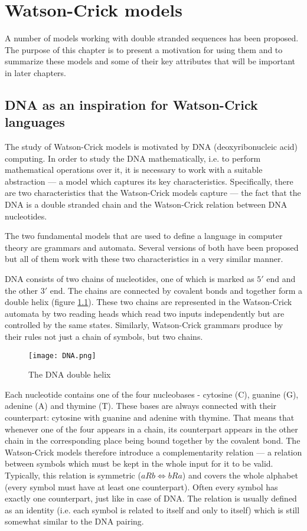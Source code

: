 \chapter{Watson-Crick models} \label{chapter:models}
A number of models working with double stranded sequences has been proposed. The purpose of this chapter is to present a motivation for using them and to summarize these models and some of their key attributes that will be important in later chapters.

\section{DNA as an inspiration for Watson-Crick languages}
The study of Watson-Crick models is motivated by DNA (deoxyribonucleic acid) computing. In order to study the DNA mathematically, i.e. to perform mathematical operations over it, it is necessary to work with a suitable abstraction --- a model which captures its key characteristics. Specifically, there are two characteristics that the Watson-Crick models capture --- the fact that the DNA is a double stranded chain and the Watson-Crick relation between DNA nucleotides.

The two fundamental models that are used to define a language in computer theory are grammars and automata. Several versions of both have been proposed but all of them work with these two characteristics in a very similar manner.

DNA consists of two chains of nucleotides, one of which is marked as $5'$ end and the other $3'$ end. The chains are connected by covalent bonds and together form a double helix (figure \ref{fig:dna}). These two chains are represented in the Watson-Crick automata by two reading heads which read two inputs independently but are controlled by the same states. Similarly, Watson-Crick grammars produce by their rules not just a chain of symbols, but two chains.

\begin{figure}[ht]
  \texttt{[image: DNA.png]}
  \centering
  \label{fig:dna}
  \caption{The DNA double helix}
\end{figure}

Each nucleotide contains one of the four nucleobases - cytosine (C), guanine (G), adenine (A) and thymine (T). These bases are always connected with their counterpart: cytosine with guanine and adenine with thymine. That means that whenever one of the four appears in a chain, its counterpart appears in the other chain in the corresponding place being bound together by the covalent bond. The Watson-Crick models therefore introduce a complementarity relation --- a relation between symbols which must be kept in the whole input for it to be valid. Typically, this relation is symmetric ($a R b \Leftrightarrow b R a$) and covers the whole alphabet (every symbol must have at least one counterpart). Often every symbol has exactly one counterpart, just like in case of DNA. The relation is usually defined as an identity (i.e. each symbol is related to itself and only to itself) which is still somewhat similar to the DNA pairing.

